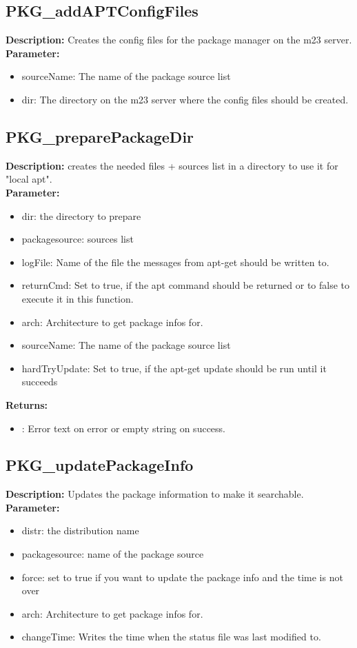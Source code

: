 \subsection{PKG\_addAPTConfigFiles}
\textbf{Description:} Creates the config files for the package manager on the m23 server.\\
\textbf{Parameter:}
\begin{itemize}
\item sourceName: The name of the package source list
\item dir: The directory on the m23 server where the config files should be created.
\end{itemize}

\subsection{PKG\_preparePackageDir}
\textbf{Description:} creates the needed files + sources list in a directory to use it for "local apt".\\
\textbf{Parameter:}
\begin{itemize}
\item dir: the directory to prepare
\item packagesource: sources list
\item logFile: Name of the file the messages from apt-get should be written to.
\item returnCmd: Set to true, if the apt command should be returned or to false to execute it in this function.
\item arch: Architecture to get package infos for.
\item sourceName: The name of the package source list
\item hardTryUpdate: Set to true, if the apt-get update should be run until it succeeds
\end{itemize}
\textbf{Returns:}
\begin{itemize}
\item : Error text on error or empty string on success.
\end{itemize}

\subsection{PKG\_updatePackageInfo}
\textbf{Description:} Updates the package information to make it searchable.\\
\textbf{Parameter:}
\begin{itemize}
\item distr: the distribution name
\item packagesource: name of the package source
\item force: set to true if you want to update the package info and the time is not over
\item arch: Architecture to get package infos for.
\item changeTime: Writes the time when the status file was last modified to.
\end{itemize}

